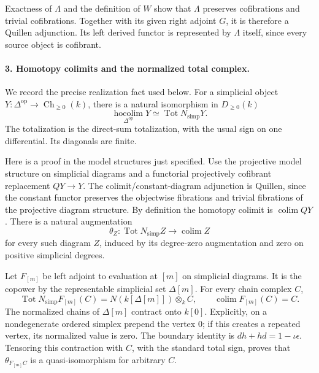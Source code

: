 Exactness of \(\Lambda\) and the definition of \(W\) show that
\(\Lambda\) preserves cofibrations and trivial cofibrations.
Together with its given right adjoint \(G\), it is therefore
a Quillen adjunction.  Its left derived functor is represented
by \(\Lambda\) itself, since every source object is cofibrant.

\paragraph{3. Homotopy colimits and the normalized total complex.}
We record the precise realization fact used below.
For a simplicial object
\(Y:\Delta^{\mathrm{op}}\to\operatorname{Ch}_{\ge0}(k)\),
there is a natural isomorphism in \(D_{\ge0}(k)\)
\[
 \operatorname*{hocolim}_{\Delta^{\mathrm{op}}}Y
       \simeq\operatorname{Tot}N_{\mathrm{simp}}Y.
 \tag{SM29.5}
\]
The totalization is the direct-sum totalization, with the usual
sign on one differential.  Its diagonals are finite.

Here is a proof in the model structures just specified.
Use the projective model structure on simplicial diagrams and
a functorial projectively cofibrant replacement \(QY\to Y\).
The colimit/constant-diagram adjunction is Quillen, since the
constant functor preserves the objectwise fibrations and trivial
fibrations of the projective diagram structure.
By definition the homotopy colimit is \(\operatorname{colim}QY\).
There is a natural augmentation
\[
 \theta_Z:\operatorname{Tot}N_{\mathrm{simp}}Z
              \longrightarrow\operatorname{colim}Z
\]
for every such diagram \(Z\), induced by its degree-zero
augmentation and zero on positive simplicial degrees.

Let \(F_{[m]}\) be left adjoint to evaluation at \([m]\) on
simplicial diagrams.  It is the copower by the representable
simplicial set \(\Delta[m]\).  For every chain complex \(C\),
\[
 \operatorname{Tot}N_{\mathrm{simp}}F_{[m]}(C)
       =N(k[\Delta[m]])\otimes_k C,\qquad
 \operatorname{colim}F_{[m]}(C)=C.
\]
The normalized chains of \(\Delta[m]\) contract onto \(k[0]\).
Explicitly, on a nondegenerate ordered simplex prepend the
vertex \(0\); if this creates a repeated vertex, its normalized
value is zero.  The boundary identity is
\(dh+hd=1-\iota\epsilon\).
Tensoring this contraction with \(C\), with the standard total
sign, proves that \(\theta_{F_{[m]}C}\) is a quasi-isomorphism
for arbitrary \(C\).

